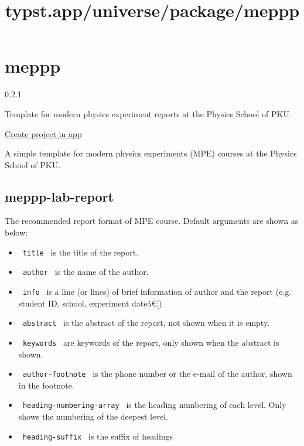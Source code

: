 \title{typst.app/universe/package/meppp}

\label{banner}
\label{template-thumbnail}

\section{meppp}\label{meppp}

{ 0.2.1 }

Template for modern physics experiment reports at the Physics School of
PKU.

\href{/app?template=meppp&version=0.2.1}{Create project in app}

\label{readme}
A simple template for modern physics experiments (MPE) courses at the
Physics School of PKU.

\subsection{meppp-lab-report}\label{meppp-lab-report}

The recommended report format of MPE course. Default arguments are shown
as below:

\begin{Shaded}
\begin{Highlighting}[]

\end{Highlighting}
\end{Shaded}

\begin{itemize}
\tightlist
\item
  \texttt{\ title\ } is the title of the report.
\item
  \texttt{\ author\ } is the name of the author.
\item
  \texttt{\ info\ } is a line (or lines) of brief information of author
  and the report (e.g. student ID, school, experiment dateâ€¦)
\item
  \texttt{\ abstract\ } is the abstract of the report, not shown when it
  is empty.
\item
  \texttt{\ keywords\ } are keywords of the report, only shown when the
  abstract is shown.
\item
  \texttt{\ author-footnote\ } is the phone number or the e-mail of the
  author, shown in the footnote.
\item
  \texttt{\ heading-numbering-array\ } is the heading numbering of each
  level. Only shows the numbering of the deepest level.
\item
  \texttt{\ heading-suffix\ } is the suffix of headings
\end{itemize}

